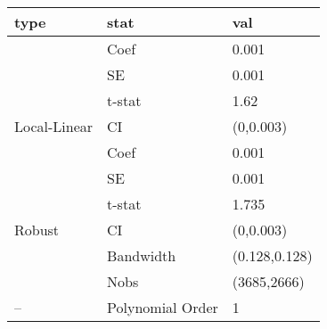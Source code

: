 
\begin{tabular}{lll}
\toprule
type & stat & val\\
\midrule
 & Coef & 0.001\\

 & SE & 0.001\\

 & t-stat & 1.62\\

\multirow{-4}{*}{\raggedright\arraybackslash Local-Linear} & CI & (0,0.003)\\
\cmidrule{1-3}
 & Coef & 0.001\\

 & SE & 0.001\\

 & t-stat & 1.735\\

\multirow{-4}{*}{\raggedright\arraybackslash Robust} & CI & (0,0.003)\\
\cmidrule{1-3}
 & Bandwidth & (0.128,0.128)\\

 & Nobs & (3685,2666)\\

\multirow{-3}{*}{\raggedright\arraybackslash --} & Polynomial Order & 1\\
\bottomrule
\end{tabular}